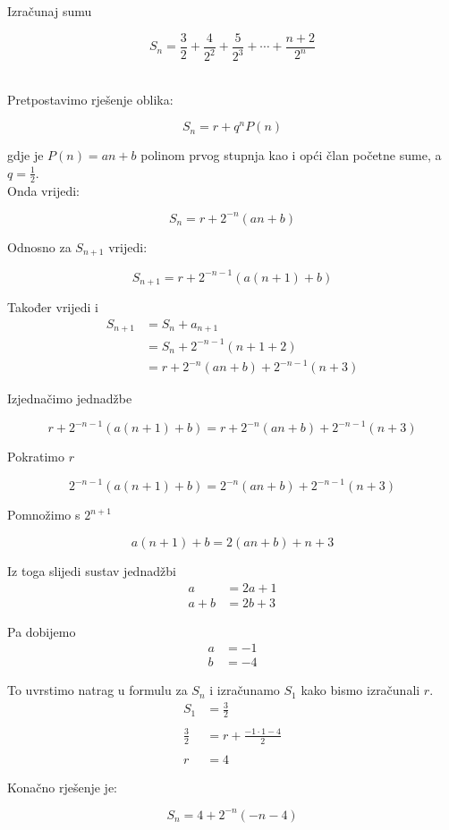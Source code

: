 \documentclass[exam.tex]{subfiles}
\begin{document}
	\begin{task}
		Izračunaj sumu
	
		\[ S_n = \frac{3}{2} + \frac{4}{2^2} + \frac{5}{2^3} + \cdots + \frac{n+2}{2^n} \]\\[1em]
	\end{task} 
	
	Pretpostavimo rješenje oblika:
	
	\[ S_n = r + q^n P(n) \]
	
	gdje je \( P(n) = an + b \) polinom prvog stupnja kao i opći član početne sume, a \( q = \frac{1}{2} \). \\
	
	Onda vrijedi:
	
	\[ S_n = r + 2^{-n} (an + b) \]
	
	Odnosno za \( S_{n+1} \) vrijedi:
	
	\[ S_{n + 1} = r + 2^{-n-1} (a(n + 1) + b) \]
	
	Također vrijedi i
	\begin{align*}
		S_{n + 1} &= S_n + a_{n + 1} \\
		&= S_n + 2^{-n - 1} (n + 1 + 2)  \\
		&= r + 2^{-n} (an + b) + 2^{-n-1} (n + 3) 
	\end{align*}
	
	Izjednačimo jednadžbe
	
	\[ r + 2^{-n-1} (a(n + 1) + b) = r + 2^{-n} (an + b) + 2^{-n-1} (n + 3) \] 
	
	Pokratimo \( r \)
	
	\[ 2^{-n-1} (a(n + 1) + b) = 2^{-n} (an + b) + 2^{-n-1} (n + 3) \]
	
	Pomnožimo s \( 2^{n+1} \)
	
	\[ a(n + 1) + b = 2 (an + b) +  n + 3 \]
	
	Iz toga slijedi sustav jednadžbi
	\begin{align*}
		a &= 2a + 1 \\
		a + b &= 2b + 3
	\end{align*}
	
	Pa dobijemo 
	\begin{align*}
		a &= -1 \\
		b &= -4
	\end{align*}
	
	To uvrstimo natrag u formulu za \( S_n \) i izračunamo \( S_1 \) kako bismo izračunali \( r \).
	\begin{align*}
		S_1 &= \frac{3}{2} \\ 
		\\
		\frac{3}{2} &= r + \frac{-1 \cdot 1 - 4}{2} \\
		\\	
		r &= 4
	\end{align*}
	
	Konačno rješenje je:
	
	\[ S_n = 4 + 2^{-n} (-n -4) \]
\end{document}
